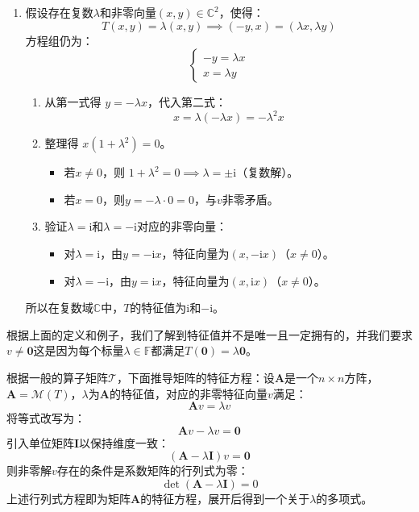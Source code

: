 \begin{example}
\begin{enumerate}
		\item 假设存在复数$\lambda$和非零向量$(x,y)\in\mathbb{C}^2$，使得：
		$$
		T(x,y) = \lambda(x,y) \implies (-y, x) = (\lambda x, \lambda y)
		$$
		方程组仍为：
		$$
		\begin{cases}
		-y = \lambda x \\
		x = \lambda y
		\end{cases}
		$$
		\begin{enumerate}
			\item 从第一式得 $y = -\lambda x$，代入第二式：$$x = \lambda (-\lambda x) = -\lambda^2 x$$
			\item 整理得 $x(1 + \lambda^2) = 0$。\begin{itemize}
				\item 若$x \neq 0$，则 $1 + \lambda^2 = 0 \implies \lambda = \pm \mathrm{i}$（复数解）。
				\item 若$x = 0$，则$y = -\lambda \cdot 0 = 0$，与$v$非零矛盾。
			\end{itemize}
			\item 验证$\lambda = \mathrm{i}$和$\lambda = -\mathrm{i}$对应的非零向量：
			\begin{itemize}
				\item 对$\lambda = \mathrm{i}$，由$y = -\mathrm{i} x$，特征向量为$(x, -\mathrm{i} x)$（$x \neq 0$）。
				\item 对$\lambda = -\mathrm{i}$，由$y = \mathrm{i} x$，特征向量为$(x, \mathrm{i} x)$（$x \neq 0$）。
			\end{itemize}
		\end{enumerate}
		所以在复数域$\mathbb{C}$中，$T$的特征值为$\mathrm{i}$和$-\mathrm{i}$。
	\end{enumerate}
\end{example}

根据上面的定义和例子，我们了解到特征值并不是唯一且一定拥有的，并我们要求$v\neq \boldsymbol{0}$这是因为每个标量$\lambda \in \mathbb{F}$都满足$T(\boldsymbol{0})=\lambda \boldsymbol{0}$。

根据一般的算子矩阵$\mathcal{T}$，下面推导矩阵的特征方程：设$\mathbf{A}$是一个$n\times n$方阵，$\mathbf{A}=\mathcal{M}(T)$，$\lambda$为$\mathbf{A}$的特征值，对应的非零特征向量$v$满足：$$\mathbf{A} v = \lambda v$$将等式改写为：$$\mathbf{A} v - \lambda v = \mathbf{0}$$引入单位矩阵$\mathbf{I}$以保持维度一致：$$(\mathbf{A} - \lambda \mathbf{I}) v = \mathbf{0}$$则非零解$v$存在的条件是系数矩阵的行列式为零：$$\det(\mathbf{A} - \lambda \mathbf{I}) = 0$$上述行列式方程即为矩阵$\mathbf{A}$的特征方程，展开后得到一个关于$\lambda$的多项式。

